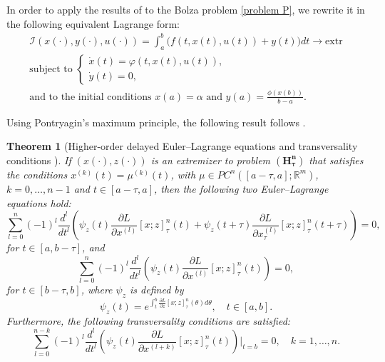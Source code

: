 \documentclass{my-aims}
\newtheorem{theorem}{Theorem}[section]
\theoremstyle{definition}
\begin{document}
In order to apply the results of \cite{Torres2003MR1980565}
to the Bolza problem \eqref{problem P}, we rewrite
it in the following equivalent Lagrange form:
\begin{equation*}
\begin{gathered}
\mathcal{I}(x(\cdot),y(\cdot),u(\cdot))
=\int_a^b \big(f(t,x(t),u(t))+ y(t)\big) dt \longrightarrow \mathrm{extr}\\
\text{subject to }
\begin{cases}
\dot{x}(t)=\varphi\left(t,x(t),u(t)\right),\\
\dot{y}(t)=0,
\end{cases}\\
\text{and to the initial conditions }
x(a)=\alpha \text{ and } y(a)= \frac{\phi(x(b))}{b-a}.
\end{gathered}
\end{equation*}

Using Pontryagin's maximum principle,  
the following result follows \cite{MyArt05}.

\begin{theorem}[Higher-order delayed Euler--Lagrange equations 
and transversality conditions \cite{MyArt05}]
\label{thm:E-L}
If $(x(\cdot),z(\cdot))$ is an extremizer to problem $\mathbf{(H_\tau^n)}$
that satisfies the conditions $x^{(k)}(t)=\mu^{(k)}(t)$, with $\mu \in PC^n ([a-\tau,a];
\mathbb{R}^m)$, $k=0,\dots,n-1$ and $t\in [a-\tau, a]$, 
then the following two Euler--Lagrange equations hold:
\begin{equation*}
\sum_{l=0}^{n}(-1)^l\frac{d^l}{dt^l}\left(\psi_z(t)\frac{\partial L}{\partial
x^{(l)}}[x;z]^n_\tau(t)+\psi_z(t+\tau)\frac{\partial L}{\partial
x_\tau^{(l)}}[x;z]^n_\tau(t+\tau)\right)=0,
\end{equation*}
for $t \in [a,b-\tau]$, and
\begin{equation*}
\sum_{l=0}^{n}(-1)^l\frac{d^l}{dt^l}\left(\psi_z(t)
\frac{\partial L}{\partial x^{(l)}}[x;z]^n_\tau(t)\right)=0,
\end{equation*}
for $t \in [b-\tau,b]$, where $\psi_z$ is defined by
\begin{equation*}
\psi_z(t)=e^{\int_t^b\frac{\partial L}{\partial z}[x;z]^n_\tau(\theta)d\theta},
\quad t \in [a,b].
\end{equation*}
Furthermore, the following transversality conditions are satisfied:
\begin{equation*}
\sum_{l=0}^{n-k}(-1)^l\frac{d^l}{dt^l}\left(\psi_z(t)
\frac{\partial L}{\partial x^{(l+k)}}[x;z]^n_\tau(t)\right)\bigg\vert_{t=b}=0, \quad k=1,\dots,n.
\end{equation*}
\end{theorem}
\end{document}
